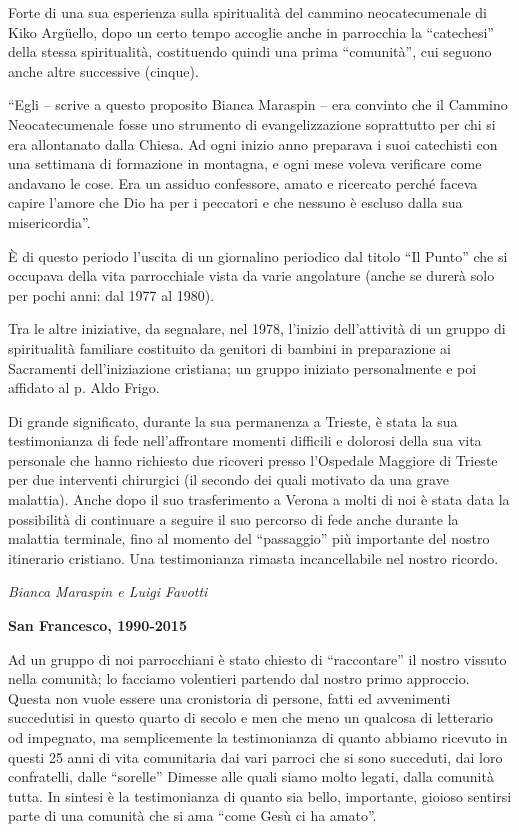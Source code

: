 Forte di una sua esperienza sulla spiritualità del cammino neocatecumenale di Kiko 
Argüello, dopo  un certo tempo accoglie anche in parrocchia la “catechesi” della stessa spiritualità, 
costituendo quindi una prima “comunità”, cui seguono anche altre successive (cinque). 

“Egli – scrive a questo proposito Bianca Maraspin – era convinto che il Cammino 
Neocatecumenale fosse uno strumento di evangelizzazione soprattutto per chi si era allontanato 
dalla Chiesa. Ad ogni inizio anno preparava i suoi catechisti con una settimana di formazione in 
montagna, e ogni mese voleva verificare come andavano le cose. Era un assiduo confessore, amato 
e ricercato perché faceva capire l’amore che Dio ha per i peccatori e che nessuno è escluso dalla sua 
misericordia”.

È di questo periodo l'uscita di un giornalino periodico dal titolo ``Il Punto'' che si occupava della vita parrocchiale
vista da varie angolature (anche se durerà solo per pochi anni: dal 1977 al 1980).

Tra le altre iniziative, da segnalare, nel 1978, l’inizio dell’attività di un gruppo di spiritualità 
familiare costituito da genitori di bambini in preparazione ai Sacramenti dell’iniziazione cristiana; 
un gruppo iniziato personalmente e poi affidato al p. Aldo Frigo. 

Di grande significato, durante la sua permanenza a Trieste, è stata la sua testimonianza di 
fede nell’affrontare momenti difficili e dolorosi della sua vita personale che hanno richiesto due 
ricoveri presso l’Ospedale Maggiore di Trieste per due interventi chirurgici (il secondo dei quali 
motivato da una grave malattia).  Anche dopo il suo trasferimento a Verona  a molti di noi è stata 
data la possibilità di continuare a seguire il suo percorso di fede anche durante la malattia terminale, 
fino al momento del “passaggio” più importante del nostro itinerario cristiano. Una testimonianza  
rimasta incancellabile nel nostro ricordo.
\begin{flushright}
\textit{Bianca Maraspin e Luigi Favotti}
\end{flushright}
\bigskip
{}
{}
\begin{center}
\textbf{\Large San Francesco, 1990-2015}
\end{center}
\bigbreak
Ad un gruppo di noi parrocchiani è stato chiesto di “raccontare” il nostro vissuto nella
comunità; lo facciamo volentieri partendo dal nostro primo approccio.
Questa non vuole essere una cronistoria di persone, fatti ed avvenimenti succedutisi in questo 
quarto di secolo e men che meno un qualcosa di letterario od impegnato, ma semplicemente  la 
testimonianza di quanto abbiamo ricevuto in questi 25 anni di vita comunitaria dai vari parroci che 
si sono succeduti, dai loro confratelli, dalle “sorelle” Dimesse alle quali siamo molto legati, dalla 
comunità tutta. In sintesi è la testimonianza di quanto sia bello, importante, gioioso sentirsi parte di 
una comunità che si ama “come Gesù ci ha amato”.

